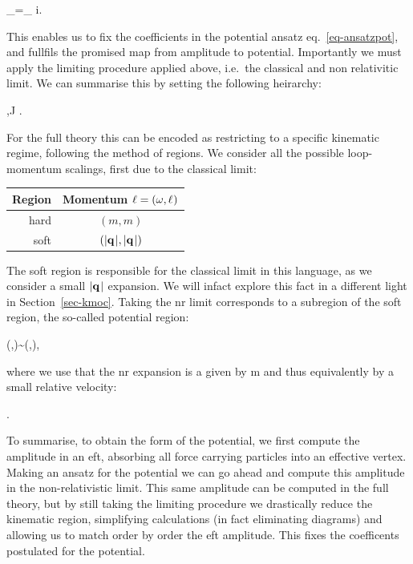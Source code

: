 \documentclass[
  10pt,
  a4paper,
  DIV=11,
  numbers=noendperiod,
  twoside]{scrreprt}
\let\[\relax \let\]\relax %
\DeclareRobustCommand{\[}{\begin{equation}}
\DeclareRobustCommand{\]}{\end{equation}}
\begin{document}
\[
\ampl[(i)]_=\ampl[(i)]_ \quad \forall i.
\]

This enables us to fix the coefficients in the potential ansatz
eq.~\ref{eq-ansatzpot}, and fullfils the promised map from amplitude to
potential. Importantly we must apply the limiting procedure applied
above, i.e.~the classical and non relativitic limit. We can summarise
this by setting the following heirarchy:

\[
\mass[1],\mass[2]\ll J  \ll {}.
\]

For the full theory this can be encoded as restricting to a specific
kinematic regime, following the method of regions. We consider all the
possible loop-momentum scalings, first due to the classical limit:

\begin{longtable}[]{@{}rc@{}}
\toprule()
Region & Momentum \(\ell = (\omega,\mathbf{{\ell}}_{})\) \\
\midrule()
\endhead
hard & \((m,m)\) \\
soft & \((\vert\mathbf{{q_{}}}_{} \vert,\vert\mathbf{{q_{}}}_{} \vert)\) \\
\bottomrule()
\end{longtable}

The soft region is responsible for the classical limit in this language,
as we consider a small \(\vert\mathbf{{q_{}}}_{} \vert\) expansion. We will infact
explore this fact in a different light in Section~\ref{sec-kmoc}. Taking
the \gls{nr} limit corresponds to a subregion of the soft region, the
so-called potential region:

\[ (\omega,\tv{\ell})\sim (\abs{\tv{\tm}},\abs{\tv{\tm}}),\]

where we use that the \gls{nr} expansion is a given by
\[\abs{\tv{\emom}}\ll m\] and thus equivalently by a small relative velocity:

\[ \abs{\tv{\vel}}.\]

To summarise, to obtain the form of the potential, we first compute the
amplitude in an \gls{eft}, absorbing all force carrying particles into
an effective vertex. Making an ansatz for the potential we can go ahead
and compute this amplitude in the non-relativistic limit. This same
amplitude can be computed in the full theory, but by still taking the
limiting procedure we drastically reduce the kinematic region,
simplifying calculations (in fact eliminating diagrams) and allowing us
to match order by order the \gls{eft} amplitude. This fixes the
coefficents postulated for the potential.
\end{document}
